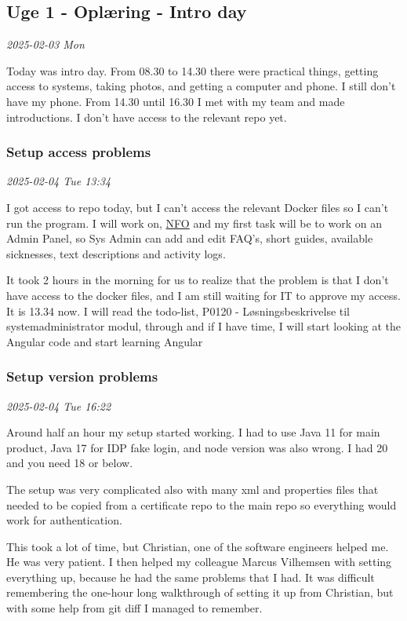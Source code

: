 \documentclass[../main.tex]{subfiles}
\begin{document}
\subsection{Uge 1 - Oplæring - \textbf{Intro day}}

\textit{2025-02-03 Mon}

Today was intro day. From 08.30 to 14.30 there were practical things, getting access to systems, taking photos, and getting a computer and phone. I still don't have my phone. From 14.30 until 16.30 I met with my team and made introductions. I don't have access to the relevant repo yet.

\subsubsection{\textbf{Setup access problems}}

\textit{2025-02-04 Tue 13:34}

I got access to repo today, but I can't access the relevant Docker files so I can't run the program. I will work on, \href{https://nationaltforsoegsoverblik.dk/}{NFO} and my first task will be to work on an Admin Panel, so Sys Admin can add and edit FAQ's, short guides, available sicknesses, text descriptions and activity logs.

It took 2 hours in the morning for us to realize that the problem is that I don't have access to the docker files, and I am still waiting for IT to approve my access. It is 13.34 now. I will read the todo-list, P0120 - Løsningsbeskrivelse til systemadministrator modul, through and if I have time, I will start looking at the Angular code and start learning Angular

\subsubsection{\textbf{Setup version problems}}

\textit{2025-02-04 Tue 16:22}

Around half an hour my setup started working. I had to use Java 11 for main product, Java 17 for IDP fake login, and node version was also wrong. I had 20 and you need 18 or below.

The setup was very complicated also with many xml and properties files that needed to be copied from a certificate repo to the main repo so everything would work for authentication.

This took a lot of time, but Christian, one of the software engineers helped me. He was very patient. I then helped my colleague Marcus Vilhemsen with setting everything up, because he had the same problems that I had. It was difficult remembering the one-hour long walkthrough of setting it up from Christian, but with some help from git diff I managed to remember.
\end{document}
